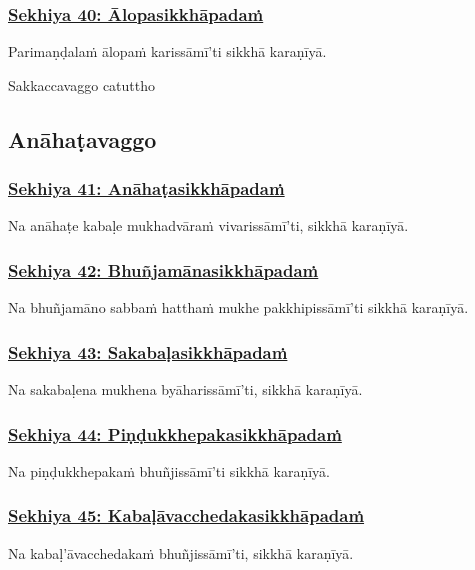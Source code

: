 \subsubsection*{\hyperref[training40]{Sekhiya 40: Ālopasikkhāpadaṁ}}
\label{sekh40}
Parimaṇḍalaṁ ālopaṁ karissāmī'ti sikkhā karaṇīyā.

\begin{center}
  Sakkaccavaggo catuttho
\end{center}

\subsection{Anāhaṭavaggo}
\vspace{0.2cm}

\subsubsection*{\hyperref[training41]{Sekhiya 41: Anāhaṭasikkhāpadaṁ}}
\label{sekh41}
Na anāhaṭe kabaḷe mukhadvāraṁ vivarissāmī'ti, sikkhā karaṇīyā.

\subsubsection*{\hyperref[training42]{Sekhiya 42: Bhuñjamānasikkhāpadaṁ}}
\label{sekh42}
Na bhuñjamāno sabbaṁ hatthaṁ mukhe pakkhipissāmī'ti sikkhā karaṇīyā.

\subsubsection*{\hyperref[training43]{Sekhiya 43: Sakabaḷasikkhāpadaṁ}}
\label{sekh43}
Na sakabaḷena mukhena byāharissāmī'ti, sikkhā karaṇīyā.

\subsubsection*{\hyperref[training44]{Sekhiya 44: Piṇḍukkhepakasikkhāpadaṁ}}
\label{sekh44}
Na piṇḍukkhepakaṁ bhuñjissāmī'ti sikkhā karaṇīyā.

\subsubsection*{\hyperref[training45]{Sekhiya 45: Kabaḷāvacchedakasikkhāpadaṁ}}
\label{sekh45}
Na kabaḷ'āvacchedakaṁ bhuñjissāmī'ti, sikkhā karaṇīyā.

